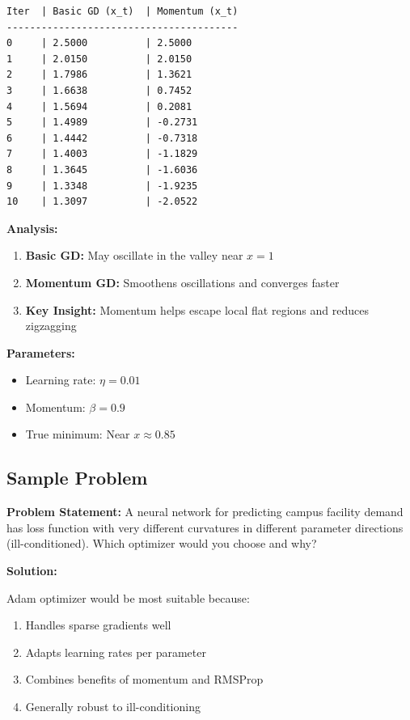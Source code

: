 \documentclass[
  letterpaper,
  DIV=11,
  numbers=noendperiod]{scrreprt}
\providecommand{\tightlist}{%
  \setlength{\itemsep}{0pt}\setlength{\parskip}{0pt}}
\begin{document}
\begin{verbatim}
Iter  | Basic GD (x_t)  | Momentum (x_t) 
----------------------------------------
0     | 2.5000          | 2.5000         
1     | 2.0150          | 2.0150         
2     | 1.7986          | 1.3621         
3     | 1.6638          | 0.7452         
4     | 1.5694          | 0.2081         
5     | 1.4989          | -0.2731        
6     | 1.4442          | -0.7318        
7     | 1.4003          | -1.1829        
8     | 1.3645          | -1.6036        
9     | 1.3348          | -1.9235        
10    | 1.3097          | -2.0522        
\end{verbatim}

\textbf{Analysis:}

\begin{enumerate}
\def\labelenumi{\arabic{enumi}.}
\tightlist
\item
  \textbf{Basic GD:} May oscillate in the valley near \(x = 1\)
\item
  \textbf{Momentum GD:} Smoothens oscillations and converges faster
\item
  \textbf{Key Insight:} Momentum helps escape local flat regions and
  reduces zigzagging
\end{enumerate}

\textbf{Parameters:}

\begin{itemize}
\tightlist
\item
  Learning rate: \(\eta = 0.01\)
\item
  Momentum: \(\beta = 0.9\)
\item
  True minimum: Near \(x ≈ 0.85\)
\end{itemize}

\subsection{Sample Problem}\label{sample-problem-18}

\textbf{Problem Statement:} A neural network for predicting campus
facility demand has loss function with very different curvatures in
different parameter directions (ill-conditioned). Which optimizer would
you choose and why?

\textbf{Solution:}

Adam optimizer would be most suitable because:

\begin{enumerate}
\def\labelenumi{\arabic{enumi}.}
\tightlist
\item
  Handles sparse gradients well
\item
  Adapts learning rates per parameter
\item
  Combines benefits of momentum and RMSProp
\item
  Generally robust to ill-conditioning
\end{enumerate}
\end{document}
